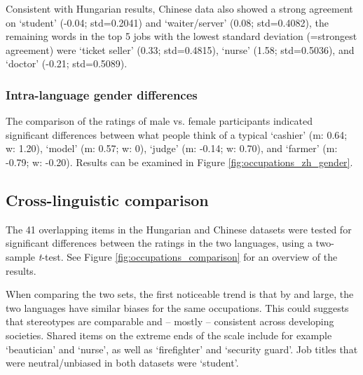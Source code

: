 \documentclass[11pt]{article}
\newcommand{\zh}[1]{\simplifiedchinesefont{#1}\rmfamily}
\begin{document}
Consistent with Hungarian results, Chinese data also showed a strong agreement on \zh{学生} `student' (-0.04; std=0.2041) and \zh{服务员} `waiter/server' (0.08; std=0.4082), the remaining words in the top 5 jobs with the lowest standard deviation (=strongest agreement) were \zh{售票员} `ticket seller' (0.33; std=0.4815), \zh{护士} `nurse' (1.58; std=0.5036), and \zh{医生} `doctor' (-0.21; std=0.5089).



\subsubsection{Intra-language gender differences}

The comparison of the ratings of male vs. female participants indicated significant differences between what people think of a typical \zh{收银员} `cashier' (m: 0.64; w: 1.20), \zh{模特} `model' (m: 0.57; w: 0), \zh{法官} `judge' (m: -0.14; w: 0.70), and \zh{农民} `farmer' (m: -0.79; w: -0.20). Results can be examined in Figure \ref{fig:occupations_zh_gender}.



\subsection{Cross-linguistic comparison}

The 41 overlapping items in the Hungarian and Chinese datasets were tested for significant differences between the ratings in the two languages, using a two-sample \textit{t}-test. See Figure \ref{fig:occupations_comparison} for an overview of the results.

When comparing the two sets, the first noticeable trend is that by and large, the two languages have similar biases for the same occupations. This could suggests that stereotypes are comparable and -- mostly -- consistent across developing societies. Shared items on the extreme ends of the scale include for example `beautician' and `nurse', as well as `firefighter' and `security guard'. Job titles that were neutral/unbiased in both datasets were `student'.
\end{document}

